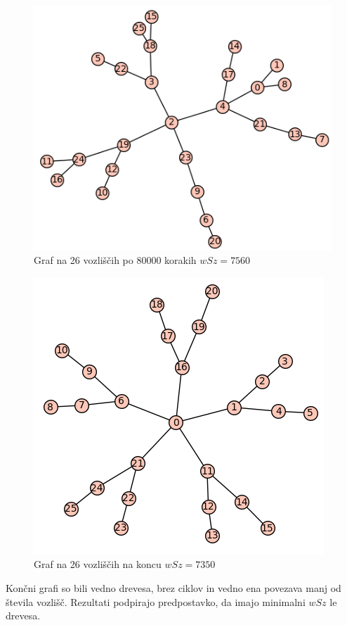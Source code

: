 \documentclass[12pt, a4paper]{article}
\begin{document}
\newpage

\begin{figure}[h]
\centering
\includegraphics[scale=0.7]{iskanje_graf26_3}
\caption{Graf na 26 vozliščih po 80000 korakih $wSz = 7560$}
\end{figure}

\begin{figure}[h]
\centering
\includegraphics[scale=0.7]{koncni_graf26}
\caption{Graf na 26 vozliščih na koncu $wSz = 7350$}
\end{figure}

Končni grafi so bili vedno drevesa, brez ciklov in vedno ena povezava manj od števila vozlišč. Rezultati podpirajo predpostavko, da imajo  minimalni $wSz$ le drevesa.
\end{document}
